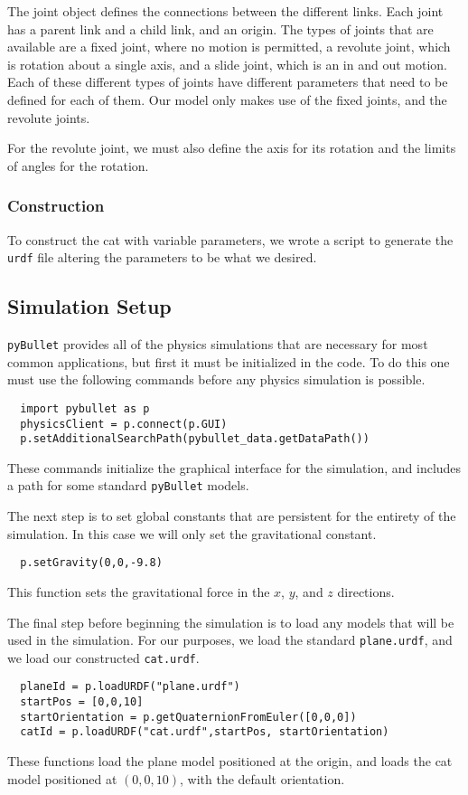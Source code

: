 \documentclass[12]{amsart}
\theoremstyle{definition}
\begin{document}
The joint object defines the connections between the different links. Each
joint has a parent link and a child link, and an origin. The types of joints
that are available are a fixed joint, where no motion is permitted, a revolute
joint, which is rotation about a single axis, and a slide joint, which is an in
and out motion. Each of these different types of joints have different
parameters that need to be defined for each of them. Our model only makes use
of the fixed joints, and the revolute joints.

For the revolute joint, we must also define the axis for its rotation and the
limits of angles for the rotation.

\subsubsection{Construction}%
\label{ssub:construction}

To construct the cat with variable parameters, we wrote a script to generate
the \texttt{urdf} file altering the parameters to be what we desired.

\subsection{Simulation Setup}%
\label{sub:simulation_setup}

\texttt{pyBullet} provides all of the physics simulations that are necessary
for most common applications, but first it must be initialized in the code. To
do this one must use the following commands before any physics simulation is
possible.
\begin{verbatim}
  import pybullet as p
  physicsClient = p.connect(p.GUI)
  p.setAdditionalSearchPath(pybullet_data.getDataPath())
\end{verbatim}
These commands initialize the graphical interface for the simulation, and
includes a path for some standard \texttt{pyBullet} models.

The next step is to set global constants that are persistent for the entirety
of the simulation. In this case we will only set the gravitational constant.
\begin{verbatim}
  p.setGravity(0,0,-9.8)
\end{verbatim}
This function sets the gravitational force in the $x$, $y$, and $z$ directions.

The final step before beginning the simulation is to load any models that will
be used in the simulation. For our purposes, we load the standard
\texttt{plane.urdf}, and we load our constructed \texttt{cat.urdf}.
\begin{verbatim}
  planeId = p.loadURDF("plane.urdf")
  startPos = [0,0,10]
  startOrientation = p.getQuaternionFromEuler([0,0,0])
  catId = p.loadURDF("cat.urdf",startPos, startOrientation)
\end{verbatim}
These functions load the plane model positioned at the origin, and loads the
cat model positioned at $(0,0,10)$, with the default orientation.
\end{document}
